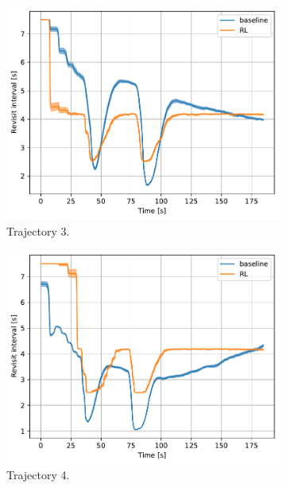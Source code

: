 \documentclass[english, 12pt, a4paper, elec, utf8, a-1b, online]{aaltothesis}
\begin{document}
\begin{figure}[htb]
    \hfill
    \begin{subfigure}[b]{0.45\textwidth}
        \centering
        \includegraphics[width=\linewidth]{figures/benchmark/Simulations/revisit_intervals_2.pdf}
        \caption{Trajectory 3.}
        \label{fig:RI_T3}
    \end{subfigure}
    \hfill
    \begin{subfigure}[b]{0.45\textwidth}
        \centering
        \includegraphics[width=\linewidth]{figures/benchmark/Simulations/revisit_intervals_3.pdf}
        \caption{Trajectory 4.}
        \label{fig:RI_T4}
    \end{subfigure}
    \hfill
    \begin{subfigure}[b]{0.45\textwidth}

\end{subfigure}
\end{figure}
\end{document}
